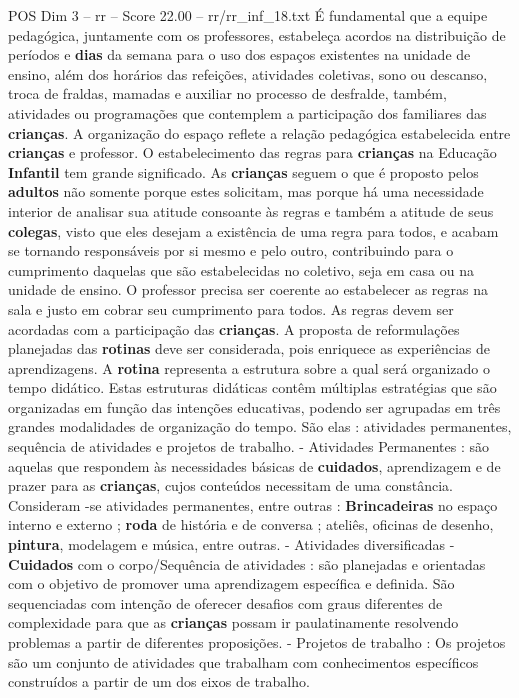 \begin{textsample}{POS Dim 3 – rr – Score 22.00 – rr/rr\_inf\_18.txt}
É fundamental que a equipe pedagógica, juntamente com os professores, estabeleça acordos na distribuição de períodos e \textbf{dias} da semana para o uso dos espaços existentes na unidade de ensino, além dos horários das refeições, atividades coletivas, sono ou descanso, troca de fraldas, mamadas e auxiliar no processo de desfralde, também, atividades ou programações que contemplem a participação dos familiares das \textbf{crianças}.
A organização do espaço reflete a relação pedagógica estabelecida entre \textbf{crianças} e professor.
O estabelecimento das regras para \textbf{crianças} na Educação \textbf{Infantil} tem grande significado.
As \textbf{crianças} seguem o que é proposto pelos \textbf{adultos} não somente porque estes solicitam, mas porque há uma necessidade interior de analisar sua atitude consoante às regras e também a atitude de seus \textbf{colegas}, visto que eles desejam a existência de uma regra para todos, e acabam se tornando responsáveis por si mesmo e pelo outro, contribuindo para o cumprimento daquelas que são estabelecidas no coletivo, seja em casa ou na unidade de ensino.
O professor precisa ser coerente ao estabelecer as regras na sala e justo em cobrar seu cumprimento para todos.
As regras devem ser acordadas com a participação das \textbf{crianças}.
A proposta de reformulações planejadas das \textbf{rotinas} deve ser considerada, pois enriquece as experiências de aprendizagens.
A \textbf{rotina} representa a estrutura sobre a qual será organizado o tempo didático.
Estas estruturas didáticas contêm múltiplas estratégias que são organizadas em função das intenções educativas, podendo ser agrupadas em três grandes modalidades de organização do tempo.
São elas : atividades permanentes, sequência de atividades e projetos de trabalho. - Atividades Permanentes : são aquelas que respondem às necessidades básicas de \textbf{cuidados}, aprendizagem e de prazer para as \textbf{crianças}, cujos conteúdos necessitam de uma constância.
Consideram -se atividades permanentes, entre outras : \textbf{Brincadeiras} no espaço interno e externo ; \textbf{roda} de história e de conversa ; ateliês, oficinas de desenho, \textbf{pintura}, modelagem e música, entre outras. - Atividades diversificadas - \textbf{Cuidados} com o corpo/Sequência de atividades : são planejadas e orientadas com o objetivo de promover uma aprendizagem específica e definida.
São sequenciadas com intenção de oferecer desafios com graus diferentes de complexidade para que as \textbf{crianças} possam ir paulatinamente resolvendo problemas a partir de diferentes proposições. - Projetos de trabalho : Os projetos são um conjunto de atividades que trabalham com conhecimentos específicos construídos a partir de um dos eixos de trabalho.

\end{textsample}
